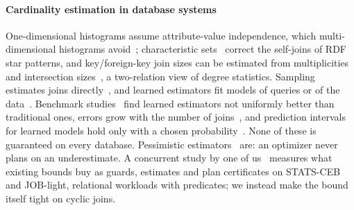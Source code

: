 \documentclass[sigconf, nonacm, acmthm=false]{acmart}
\begin{document}
\paragraph{Cardinality estimation in database systems}
One-dimensional histograms assume attribute-value independence, which
multi-dimensional histograms avoid~\cite{poosala1997selectivity}; characteristic
sets~\cite{neumann2011characteristic} correct the self-joins of RDF
star patterns, and key/foreign-key join sizes can be estimated from
multiplicities and intersection sizes~\cite{muller2021kfk}, a two-relation
view of degree statistics. Sampling estimates joins
directly~\cite{leis2017sampling,wang2020correlated}, and learned
estimators fit models of queries or of the data~\cite{kipf2019learned,yang2021neurocard}. Benchmark
studies~\cite{han2021stats,wang2021ready,kim2022learned} find learned
estimators not uniformly better than traditional ones, errors grow with
the number of joins~\cite{leis2015goodare}, and prediction intervals for
learned models hold only with a chosen probability~\cite{thirumuruganathan2022intervals}.
None of these is guaranteed on every database. Pessimistic
estimators~\cite{cai2019pessimistic,abokhamis2025pessimistic} are: an
optimizer never plans on an underestimate. A concurrent study by one of
us~\cite{lee2026sound} measures what existing bounds buy as guards,
estimates and plan certificates on STATS-CEB and JOB-light, relational
workloads with predicates; we instead make the bound itself tight on
cyclic joins.
\end{document}
